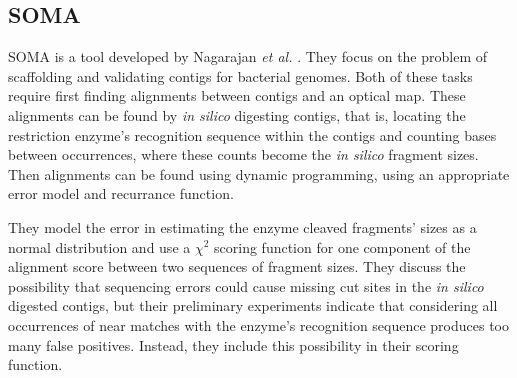 \documentclass[doctor]{thesis}
\begin{document}




\subsection{SOMA}

SOMA is a tool developed  by Nagarajan \emph{et al.} \cite{nagarajan2008}. They focus on the problem of scaffolding and validating contigs for bacterial genomes.
Both of these tasks require first finding alignments between contigs and an optical map.
These alignments can be found by \emph{in silico} digesting contigs, that is, locating the restriction enzyme's recognition sequence within the contigs and counting bases between occurrences, where these counts become the \emph{in silico} fragment sizes.
Then alignments can be found using dynamic programming, using an appropriate error model and recurrance function. 

They model the error in estimating the enzyme cleaved fragments' sizes as a normal distribution and use a $\chi^2$ scoring function for one component of the alignment score between two sequences of fragment sizes.
They discuss the possibility that sequencing errors could cause missing cut sites in the \emph{in silico} digested contigs, but their preliminary experiments indicate that considering all occurrences of near matches with the enzyme’s recognition sequence produces too many false positives.
Instead, they include this possibility in their scoring function.
\end{document}
